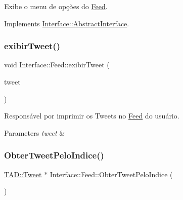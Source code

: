 Exibe o menu de opções do \hyperlink{class_interface_1_1_feed}{Feed}. 



Implements \hyperlink{class_interface_1_1_abstract_interface_af1a45726ea636cdbf1cf2d7daa5708be}{Interface\+::\+Abstract\+Interface}.

\mbox{\label{class_interface_1_1_feed_a1b34847c7ee4f9df540a5246eedd0083}} 
\subsubsection{\texorpdfstring{exibir\+Tweet()}{exibirTweet()}}
{\footnotesize\ttfamily void Interface\+::\+Feed\+::exibir\+Tweet (\begin{DoxyParamCaption}\item[{\hyperlink{class_t_a_d_1_1_tweet}{T\+A\+D\+::\+Tweet}}]{tweet }\end{DoxyParamCaption})\hspace{0.3cm}{\ttfamily [private]}}



Responsável por imprimir os Tweets no \hyperlink{class_interface_1_1_feed}{Feed} do usuário. 


\begin{DoxyParams}{Parameters}
{\em tweet} & \\
\hline
\end{DoxyParams}
\mbox{\label{class_interface_1_1_feed_a4b11fd468df68a5c41dcb5cf2b8d637d}} 
\subsubsection{\texorpdfstring{Obter\+Tweet\+Pelo\+Indice()}{ObterTweetPeloIndice()}}
{\footnotesize\ttfamily \hyperlink{class_t_a_d_1_1_tweet}{T\+A\+D\+::\+Tweet} $\ast$ Interface\+::\+Feed\+::\+Obter\+Tweet\+Pelo\+Indice (\begin{DoxyParamCaption}{ }\end{DoxyParamCaption})\hspace{0.3cm}{\ttfamily [private]}}



